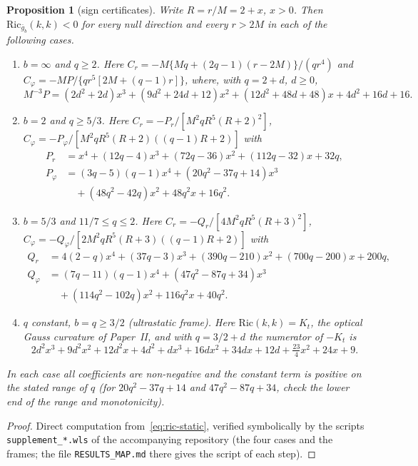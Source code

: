 \documentclass[aip,jmp,amsmath,amssymb,reprint]{revtex4-2}
\theoremstyle{plain}
\newtheorem{proposition}{Proposition}[section]
\theoremstyle{definition}
\begin{document}
\begin{proposition}[sign certificates]\label{prop:certificates}
Write $R=r/M=2+x$, $x>0$. Then $\mathrm{Ric}_{\bar g_b}(k,k)<0$ for every null direction
and every $r>2M$ in each of the following cases.
\begin{enumerate}
\item $b=\infty$ and $q\ge2$. Here
  $C_r=-M\{Mq+(2q-1)(r-2M)\}/(qr^4)$ and $C_\varphi=-MP/\{qr^5[2M+(q-1)r]\}$, where, with
  $q=2+d$, $d\ge0$,
  \[
    M^{-3}P=(2d^2+2d)x^3+(9d^2+24d+12)x^2+(12d^2+48d+48)x+4d^2+16d+16 .
  \]
\item $b=2$ and $q\ge5/3$. Here $C_r=-P_r/[M^2qR^5(R+2)^2]$,
  $C_\varphi=-P_\varphi/[M^2qR^5(R+2)((q-1)R+2)]$ with
  \begin{align*}
    P_r&=x^4+(12q-4)x^3+(72q-36)x^2+(112q-32)x+32q,\\
    P_\varphi&=(3q-5)(q-1)x^4+(20q^2-37q+14)x^3\\
    &\quad+(48q^2-42q)x^2+48q^2x+16q^2 .
  \end{align*}
\item $b=5/3$ and $11/7\le q\le2$. Here $C_r=-Q_r/[4M^2qR^5(R+3)^2]$,
  $C_\varphi=-Q_\varphi/[2M^2qR^5(R+3)((q-1)R+2)]$ with
  \begin{align*}
    Q_r&=4(2-q)x^4+(37q-3)x^3+(390q-210)x^2+(700q-200)x+200q,\\
    Q_\varphi&=(7q-11)(q-1)x^4+(47q^2-87q+34)x^3\\
    &\quad+(114q^2-102q)x^2+116q^2x+40q^2 .
  \end{align*}
\item $q$ constant, $b=q\ge3/2$ (ultrastatic frame). Here $\mathrm{Ric}(k,k)=K_t$, the
  optical Gauss curvature of Paper~II, and with $q=3/2+d$ the numerator of $-K_t$ is
  \[
    2d^2x^3+9d^2x^2+12d^2x+4d^2+dx^3+16dx^2+34dx+12d+\tfrac{23}{4}x^2+24x+9 .
  \]
\end{enumerate}
In each case all coefficients are non-negative and the constant term is positive on the
stated range of $q$ (for $20q^2-37q+14$ and $47q^2-87q+34$, check the lower end of the
range and monotonicity).
\end{proposition}

\begin{proof}
Direct computation from~\eqref{eq:ric-static}, verified symbolically by the scripts
\texttt{supplement\_*.wls} of the accompanying repository (the four cases and the frames; the file
\texttt{RESULTS\_MAP.md} there gives the script of each step).
\end{proof}
\end{document}
